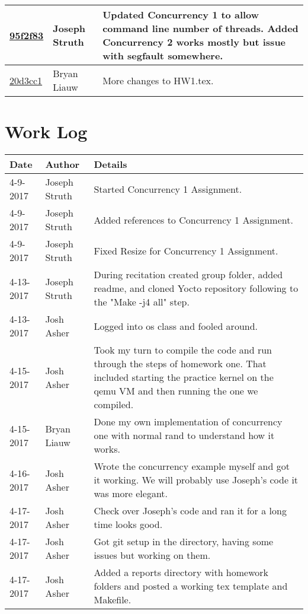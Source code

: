 \documentclass[10pt,draftclsnofoot,onecolumn, compsoc]{IEEEtran}
\begin{document}
\begin{tabular}{| l | l | p{15cm} |}
\href{https://github.com/struthj/CS444/commit/95f2f83c730dfb35f0292b3a825747fdde110c49}{95f2f83} & Joseph Struth & Updated Concurrency 1 to allow command line number of threads. Added Concurrency 2 works mostly but issue with segfault somewhere.\\\hline
\href{ssh://liauwb@os-class.engr.oregonstate.edu/scratch/spring2017/13-03/commit/41258d3b958b7baf59b67dfc110164531afda87}{20d3cc1} & Bryan Liauw & More changes to HW1.tex.\\\hline
\end{tabular}

\section{Work Log}
\begin{tabular}{| l | l | p{15cm} |}\textbf{Date} & \textbf{Author} & \textbf{Details}\\\hline
4-9-2017 & Joseph Struth & Started Concurrency 1 Assignment.\\\hline
4-9-2017 & Joseph Struth & Added references to Concurrency 1 Assignment.\\\hline
4-9-2017 & Joseph Struth & Fixed Resize for Concurrency 1 Assignment.\\\hline
4-13-2017 & Joseph Struth & During recitation created group folder, added readme, and cloned Yocto repository following to the "Make -j4 all" step.\\\hline
4-13-2017 & Josh Asher & Logged into os class and fooled around.\\\hline
4-15-2017 & Josh Asher & Took my turn to compile the code and run through the steps of homework one. That included starting the practice kernel on the qemu VM and then running the one we compiled.\\\hline
4-15-2017 & Bryan Liauw & Done my own implementation of concurrency one with normal rand to understand how it works.\\\hline
4-16-2017 & Josh Asher & Wrote the concurrency example myself and got it working. We will probably use Joseph's code it was more elegant.\\\hline
4-17-2017 & Josh Asher & Check over Joseph's code and ran it for a long time looks good.\\\hline
4-17-2017 & Josh Asher & Got git setup in the directory, having some issues but working on them.\\\hline
4-17-2017 & Josh Asher & Added a reports directory with homework folders and posted a working tex template and Makefile.\\\hline

\end{tabular}
\end{document}

